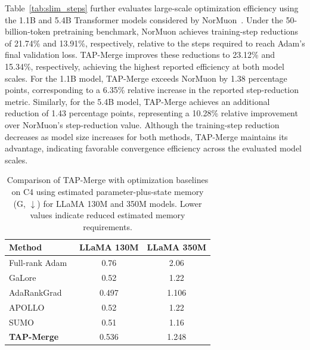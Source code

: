 \documentclass[fleqn,10pt]{wlscirep}
\begin{document}
Table~\ref{tab:slim_steps} further evaluates large-scale optimization efficiency using the 1.1B and 5.4B Transformer models considered by NorMuon~\cite{normuon2026}. Under the 50-billion-token pretraining benchmark, NorMuon achieves training-step reductions of 21.74\% and 13.91\%, respectively, relative to the steps required to reach Adam's final validation loss. TAP-Merge improves these reductions to 23.12\% and 15.34\%, respectively, achieving the highest reported efficiency at both model scales. For the 1.1B model, TAP-Merge exceeds NorMuon by 1.38 percentage points, corresponding to a 6.35\% relative increase in the reported step-reduction metric. Similarly, for the 5.4B model, TAP-Merge achieves an additional reduction of 1.43 percentage points, representing a 10.28\% relative improvement over NorMuon's step-reduction value. Although the training-step reduction decreases as model size increases for both methods, TAP-Merge maintains its advantage, indicating favorable convergence efficiency across the evaluated model scales.











\begin{table}[t]
\centering\small
\caption{Comparison of TAP-Merge with optimization
baselines on C4 using estimated parameter-plus-state
memory (G, $\downarrow$) for LLaMA 130M and 350M
models. Lower values indicate reduced
estimated memory requirements.}
\label{tab:c4_memory}
\begin{tabular}{lcc}
\toprule
Method & LLaMA 130M & LLaMA 350M\\
\midrule
Full-rank Adam~\cite{galore2024} & 0.76 & 2.06\\
GaLore~\cite{galore2024} & 0.52 & 1.22\\
AdaRankGrad~\cite{adarankgrad2025} & 0.497 & 1.106\\
APOLLO~\cite{apollo2025} & 0.52 & 1.22\\
SUMO~\cite{sumo2025} & 0.51 & 1.16\\
\midrule
\textbf{TAP-Merge} & 0.536 & 1.248\\ \bottomrule
\end{tabular}
\end{table}
\end{document}
